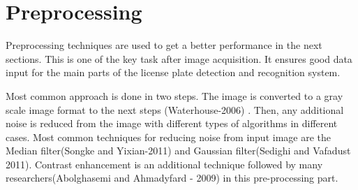 \documentclass{standalone}
\begin{document}
\section{Preprocessing}
Preprocessing techniques are used to get a better performance in the next sections. This is one of the key task after image acquisition. It ensures good data input for the main parts of the license plate detection and recognition system.

Most common approach is done in two steps. The image is converted to a gray scale image format to the next steps (Waterhouse-2006) \cite{waterhouse-2006}. Then, any additional noise is reduced from the image with different types of algorithms in different cases. Most common techniques for reducing noise from input image are the Median filter(Songke and Yixian-2011)
and Gaussian filter(Sedighi and Vafadust 2011). Contrast enhancement is an additional technique followed by many researchers(Abolghasemi and Ahmadyfard - 2009) in this pre-processing part.
\end{document}
